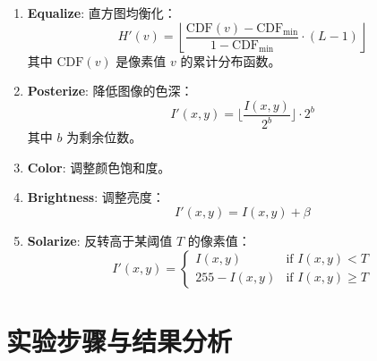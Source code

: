 \documentclass[12pt, a4paper, oneside]{ctexart}
\numberwithin{equation}{section}  %
\let\geq=\geqslant %
\begin{document}
\begin{enumerate}
    \item \textbf{Equalize}: 直方图均衡化：
    \[
    H'(v) = \left\lfloor \frac{\text{CDF}(v) - \text{CDF}_{\text{min}}}{1 - \text{CDF}_{\text{min}}} \cdot (L - 1) \right\rfloor
    \]
    其中 $\text{CDF}(v)$ 是像素值 $v$ 的累计分布函数。

    \item \textbf{Posterize}: 降低图像的色深：
    \[
    I'(x, y) = \lfloor \frac{I(x, y)}{2^b} \rfloor \cdot 2^b
    \]
    其中 $b$ 为剩余位数。

    \item \textbf{Color}: 调整颜色饱和度。

    \item \textbf{Brightness}: 调整亮度：
    \[
    I'(x, y) = I(x, y) + \beta
    \]

    \item \textbf{Solarize}: 反转高于某阈值 $T$ 的像素值：
    \[
    I'(x, y) = 
    \begin{cases} 
    I(x, y) & \text{if } I(x, y) < T \\
    255 - I(x, y) & \text{if } I(x, y) \geq T
    \end{cases}
    \]
\end{enumerate}

\section{实验步骤与结果分析}
\end{document}
